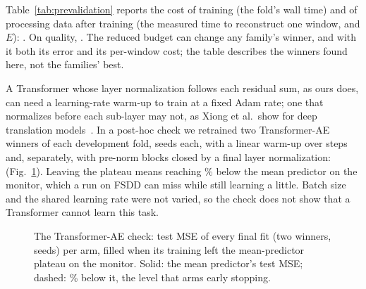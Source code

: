 \documentclass[conference]{IEEEtran}
\begin{document}
\par Table~\ref{tab:prevalidation} reports the cost of training (the fold's wall time) and of
processing data after training (the measured time to reconstruct one window, and $E$):
\preCostVerdict. On quality, \preQualityVerdict. The reduced budget can change any family's
winner, and with it both its error and its per-window cost; the table describes the winners
found here, not the families' best.
\par A Transformer whose layer normalization follows each residual sum, as ours does, can
need a learning-rate warm-up to train at a fixed Adam rate; one that normalizes before each
sub-layer may not, as Xiong et al.\ show for deep translation models~\cite{xiong2020layer}. In a
post-hoc check we retrained two Transformer-AE winners of each development fold, \preRuns{} seeds
each, with a linear warm-up over \tOneWarmupSteps{} steps and, separately, with pre-norm blocks
closed by a final layer normalization: \tOneVerdict{} (Fig.~\ref{fig:t1}). Leaving the plateau
means reaching \cfgMinSkill\% below the mean predictor on the monitor, which a run on FSDD can
miss while still learning a little. Batch size and the shared learning rate were not varied, so
the check does not show that a Transformer cannot learn this task.

\begin{figure}[!t]
  \centering
  
  \caption{The Transformer-AE check: test MSE of every final fit (two winners, \preRuns{} seeds)
  per arm, filled when its training left the mean-predictor plateau on the monitor. Solid: the
  mean predictor's test MSE; dashed: \cfgMinSkill\% below it, the level that arms early
  stopping.}
  \label{fig:t1}
\end{figure}

\begin{table}[!t]
\caption{Pre-validation, development folds, \preRuns{} runs. Fold: wall time of the family's
fold, data loading excluded (search, re-scoring, final fit, test); $\times$SNN: its ratio to
the SNN-AE's, whose fold also trains the ANN-AE. Train: final fit, per training window and
epoch. Infer.: one window reconstructed after training. One CPU thread each.}
\centering\scriptsize
\setlength{\tabcolsep}{3pt}

\label{tab:prevalidation}
\end{table}
\end{document}
